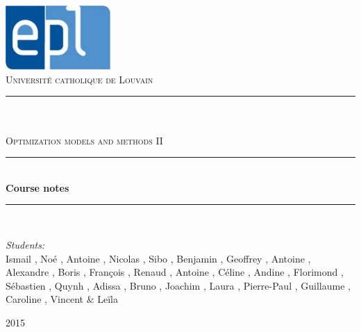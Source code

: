 \newcommand{\HRule}{\rule{\linewidth}{0.5mm}}

\begin{titlepage}
	
\begin{center}

\includegraphics[width=0.30\textwidth]{images/epl.jpg}\\[1cm]    

\textsc{\LARGE Universit\'e catholique de Louvain}\\[1.5cm]

\HRule \\[0.5cm]

\textsc{\Large {}}\\[0.2cm]
\textsc{\Large Optimization models and methods II}\\[0.5cm]


\HRule \\[2cm]
{\huge \bfseries Course notes}\\[1cm]

\HRule \\[1.5cm]

\begin{minipage}{0.8\textwidth}
\large
\emph{Students:}\\
Ismail , Noé , Antoine , Nicolas , Sibo , Benjamin , Geoffrey , Antoine , Alexandre , Boris , François , Renaud , Antoine , Céline , Andine , Florimond , Sébastien , Quynh , Adissa , Bruno , Joachim , Laura , Pierre-Paul , Guillaume , Caroline , Vincent   \& Leïla 
\end{minipage}







\vfill

{\large  2015}

\end{center}	
	
	
\end{titlepage}
